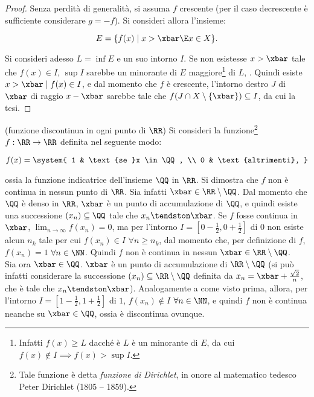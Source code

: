 \documentclass[11pt]{article}
\begin{document}
	\begin{proof}
		Senza perdità di generalità, si assuma $f$ crescente (per il caso decrescente è sufficiente considerare
		$g = -f$). Si consideri allora l'insieme:
		
		\[E = \{ f(x) \mid x > \xbar \E x \in X \}.\]
		
		\vskip 0.05in
		
		Si consideri adesso $L = \inf E$ e un suo intorno $I$. Se non
		esistesse $x > \xbar$ tale che $f(x) \in I$, $\sup I$ sarebbe
		un minorante di $E$ maggiore\footnote{Infatti $f(x) \geq L$ dacché è $L$ è un minorante di $E$, da cui $f(x) \notin I \implies
		f(x) > \sup I$.} di $L$, \Lightning. Quindi esiste
		$x > \xbar \mid f(x) \in I$, e dal momento che $f$ è
		crescente, l'intorno destro $J$ di $\xbar$ di raggio $x - \xbar$ sarebbe
		tale che $f(J \cap X \setminus \{\xbar\}) \subseteq I$, da cui la tesi.
	\end{proof}

	\begin{example} (funzione discontinua in ogni punto di $\RR$) Si consideri la funzione\footnote{Tale funzione è detta \textit{funzione di Dirichlet},
			in onore al matematico tedesco Peter Dirichlet (1805 -- 1859).} $f : \RR \to \RR$ definita
		nel seguente modo:
	
		\[ f(x) = \system{ 1 & \text{se }x \in \QQ, \\ 0 & \text{altrimenti}, } \]
		
		\vskip 0.05in
		
		ossia la funzione indicatrice dell'insieme $\QQ$ in $\RR$. Si dimostra che $f$ non è continua
		in nessun punto di $\RR$. Sia infatti $\xbar \in \RR \setminus \QQ$. Dal momento che $\QQ$ è denso
		in $\RR$, $\xbar$ è un punto di accumulazione di $\QQ$, e quindi esiste una successione $(x_n) \subseteq \QQ$
		tale che $x_n \tendston \xbar$. Se $f$ fosse continua in $\xbar$, $\lim_{n \to \infty} f(x_n) = 0$,
		ma per l'intorno $I = [0-\frac{1}{2}, 0+\frac{1}{2}]$ di $0$ non esiste alcun $n_k$ tale per cui $f(x_n) \in I$ $\forall n
		\geq n_k$, dal momento che, per definizione di $f$, $f(x_n) = 1$ $\forall n \in \NN$. Quindi $f$ non è continua
		in nessun $\xbar \in \RR \setminus \QQ$. \\
		
		Sia ora $\xbar \in \QQ$. $\xbar$ è un punto di accumulazione di $\RR \setminus \QQ$ (si può infatti
		considerare la successione $(x_n) \subseteq \RR \setminus \QQ$ definita da $x_n = \xbar + \frac{\sqrt{2}}{n}$,
		che è tale che $x_n \tendston \xbar$). Analogamente a come visto prima, allora, per l'intorno $I = [1-\frac{1}{2}, 1+\frac{1}{2}]$ di $1$, $f(x_n) \notin I$ $\forall n \in \NN$, e quindi $f$ non è continua neanche su $\xbar \in \QQ$, ossia è discontinua ovunque.
	\end{example}
\end{document}
